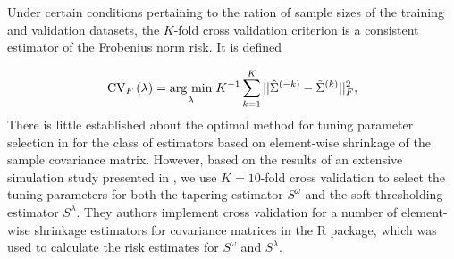 \bigskip

Under certain conditions pertaining to the ration of sample sizes of the training and validation datasets, the $K$-fold cross validation criterion is a consistent estimator of the Frobenius norm risk. It is defined 

\begin{equation} \label{eq:K-fold-matrix--cv}
\mbox{CV}_F\left(\lambda \right) = \underset{\lambda}{\operatorname{arg}\,\operatorname{min}}\; K^{-1} \sum_{k = 1}^K  \vert \vert\hat{\Sigma}^{\left(-k\right)} - \tilde{\Sigma}^{\left(k\right)}  \vert \vert_F^2, 
\end{equation}
\noindent
%
There is little established about the optimal method for tuning parameter selection in for the class of estimators based on element-wise shrinkage of the sample covariance matrix.  However, based on the results of an extensive simulation study presented in \citet{fang2016tuning}, we use $K = 10$-fold cross validation to select the tuning parameters for both the tapering estimator $S^\omega$ and the soft thresholding estimator $S^{\lambda}$. They authors implement cross validation for a number of element-wise shrinkage estimators for covariance matrices in the \citet{CVTuningCov} R package, which was used to calculate the risk estimates for $S^{\omega}$ and $S^{\lambda}$. 

